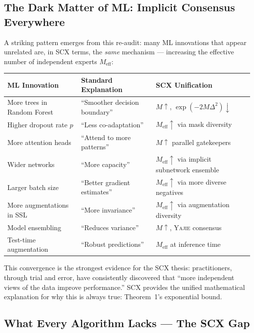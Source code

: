 \documentclass[12pt,a4paper]{article}
\theoremstyle{definition}
\newcommand{\Yajie}{\textsc{Yajie}}
\newcommand{\SCX}{\textsc{SCX}}
\begin{document}
\subsection{The Dark Matter of ML: Implicit Consensus Everywhere}

A striking pattern emerges from this re-audit: many ML innovations that appear unrelated are, in \SCX{} terms, the \emph{same} mechanism — increasing the effective number of independent experts $M_{\text{eff}}$:

\begin{center}
\begin{tabular}{@{}lll@{}}
\toprule
\textbf{ML Innovation} & \textbf{Standard Explanation} & \textbf{SCX Unification} \\
\midrule
More trees in Random Forest & ``Smoother decision boundary'' & $M \uparrow$, $\exp(-2M\Delta^2) \downarrow$ \\
Higher dropout rate $p$ & ``Less co-adaptation'' & $M_{\text{eff}} \uparrow$ via mask diversity \\
More attention heads & ``Attend to more patterns'' & $M \uparrow$ parallel gatekeepers \\
Wider networks & ``More capacity'' & $M_{\text{eff}} \uparrow$ via implicit subnetwork ensemble \\
Larger batch size & ``Better gradient estimates'' & $M_{\text{eff}} \uparrow$ via more diverse negatives \\
More augmentations in SSL & ``More invariance'' & $M_{\text{eff}} \uparrow$ via augmentation diversity \\
Model ensembling & ``Reduces variance'' & $M \uparrow$, \Yajie{} consensus \\
Test-time augmentation & ``Robust predictions'' & $M_{\text{eff}}$ at inference time \\
\bottomrule
\end{tabular}
\end{center}

This convergence is the strongest evidence for the \SCX{} thesis: practitioners, through trial and error, have consistently discovered that ``more independent views of the data improve performance.'' \SCX{} provides the unified mathematical explanation for why this is always true: Theorem~1's exponential bound.

\subsection{What Every Algorithm Lacks — The SCX Gap }
\end{document}

